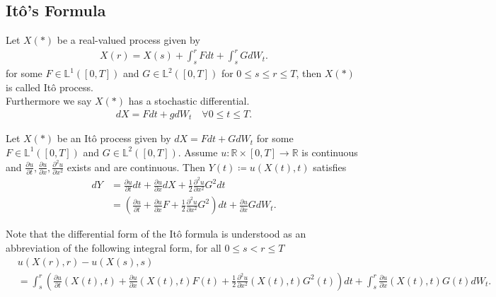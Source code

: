 \subsection{It\^o's Formula}
\begin{definition}[It\^o Process]
 Let $X(*)$ be a real-valued process given by 
 \begin{align*}
  X(r) = X(s) + \int_s^{r} F dt + \int_s^{r} GdW_t  
 .\end{align*}
 for some $F \in  \mathbb{L}^1([0,T])$ and $G \in  \mathbb{L}^2([0,T])$ for $0\le s\le r\le T$, then $X(*)$ is called It\^o process.\\[1ex]
 Furthermore we say $X(*)$ has a stochastic differential.
 \begin{align*}
  dX =  Fdt + gdW_t \quad \forall  0\le t\le T
 .\end{align*}
\end{definition}
\begin{theorem}[It\^o's Formula]
  Let $X(*)$  be an It\^o process given by $dX = F dt + GdW_t$ for some $F \in  \mathbb{L}^{1}([0,T]) $ and $G \in  \mathbb{L}^2([0,T])$. Assume 
  $u : \mathbb{R} \times  [0,T] \to \mathbb{R}$ is continuous and $\frac{\partial u}{\partial t} ,\frac{\partial u}{\partial x} ,\frac{\partial ^2 u}{\partial x^2} $ exists and 
  are continuous. Then $Y(t) \coloneqq  u(X(t),t)$ satisfies 
  \begin{align*}
    dY &= \frac{\partial u}{\partial t} dt + \frac{\partial u}{\partial x} dX + \frac{1}{2 }\frac{\partial ^2 u}{\partial x^2} G^2 dt\\
       &=(\frac{\partial u}{\partial t} +\frac{\partial u}{\partial x} F + \frac{1}{2} \frac{\partial ^2 u}{\partial x^2} G^2 )dt + \frac{\partial u}{\partial x} G dW_t
  .\end{align*}
    \end{theorem}
Note that the differential form of the It\^o formula is understood as an abbreviation of the following integral form, for all $0\le s < r \le T$
  \begin{align*}
    &u(X(r),r) - u(X(s),s) \\
    &= \int_s^{r}(\frac{\partial u}{\partial t}(X(t),t)+\frac{\partial u}{\partial x}(X(t),t)F(t) + \frac{1}{2}\frac{\partial ^2 u}{\partial x^2}(X(t),t)G^2(t) )dt + \int_s^{r} \frac{\partial u}{\partial x}(X(t),t) G(t)dW_t
  .\end{align*}


